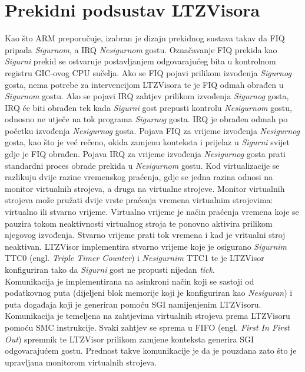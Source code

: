 \documentclass[times, utf8, diplomski, numeric]{fer}
\begin{document}
\section{Prekidni podsustav LTZVisora}
Kao što ARM preporučuje, izabran je dizajn prekidnog sustava takav da FIQ pripada \textit{Sigurnom}, a IRQ \textit{Nesigurnom} gostu. Označavanje
FIQ prekida kao \textit{Sigurni} prekid se ostvaruje postavljanjem odgovarajućeg bita u kontrolnom registru GIC-ovog CPU sučelja.
Ako se FIQ pojavi prilikom izvođenja \textit{Sigurnog} gosta, nema potrebe za intervencijom LTZVisora te je FIQ odmah obrađen u
\textit{Sigurnom} gostu. Ako se pojavi IRQ zahtjev prilikom izvođenja \textit{Sigurnog} gosta, IRQ će biti obrađen tek kada \textit{Sigurni} gost prepusti
kontrolu \textit{Nesigurnom} gostu, odnosno ne utječe na tok programa \textit{Sigurnog} gosta. IRQ je obrađen odmah po početku izvođenja
\textit{Nesigurnog} gosta. Pojava FIQ za vrijeme izvođenja \textit{Nesigurnog} gosta, kao što je već rečeno, okida zamjenu konteksta i prijelaz
u \textit{Sigurni} svijet gdje je FIQ obrađen. Pojava IRQ za vrijeme izvođenja \textit{Nesigurnog} gosta prati standardni proces obrade prekida
u \textit{Nesigurnom} gostu. Kod virtualizacije se razlikuju dvije razine vremenskog praćenja, gdje se jedna razina odnosi na monitor
virtualnih strojeva, a druga na virtualne strojeve. Monitor virtualnih strojeva može pružati dvije vrste praćenja vremena
virtualnim strojevima: virtualno ili stvarno vrijeme. Virtualno vrijeme je način praćenja vremena koje se pauzira tokom
neaktivnosti virtualnog stroja te ponovno aktivira prilikom njegovog izvođenja. Stvarno vrijeme prati tok vremena i kad je
vritualni stroj neaktivan. LTZVisor implementira stvarno vrijeme koje je osigurano \textit{Sigurnim} TTC0 (engl. \textit{Triple Timer
Counter}) i \textit{Nesigurnim} TTC1 te je LTZVisor konfiguriran tako da \textit{Sigurni} gost ne propusti nijedan \textit{tick}.\\
Komunikacija je implementirana na asinkroni način koji se sastoji od podatkovnog puta (dijeljeni blok memorije koji je
konfiguriran kao \textit{Nesiguran}) i puta događaja koji je generiran pomoću SGI namijenjenim LTZVisoru. Komunikacija je temeljena
na zahtjevima virtualnih strojeva prema LTZVisoru pomoću SMC instrukcije. Svaki zahtjev se sprema u FIFO (engl. \textit{First
In First Out}) spremnik te LTZVisor prilikom zamjene konteksta generira SGI odgovarajućem gostu. Prednost takve komunikacije
je da je pouzdana zato što je upravljana monitorom virtualnih strojeva.
\end{document}
